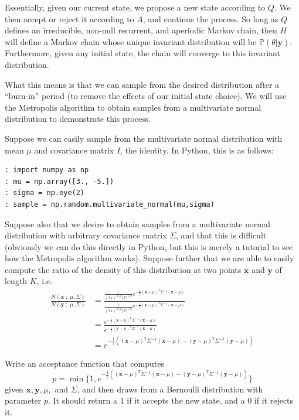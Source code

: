 Essentially, given our current state, we propose a new state according to $Q$. We then accept or reject it according to $A$, and continue the process. So long as $Q$ defines an irreducible, non-null recurrent, and aperiodic Markov chain, then $H$ will define a Markov chain whose unique invariant distribution will be $\mathbb{P}(\theta | \mathbf{y})$. Furthermore, given any initial state, the chain will converge to this invariant distribution.

What this means is that we can sample from the desired distribution after a ``burn-in'' period (to remove the effects of our initial state choice). We will use the Metropolis algorithm to obtain samples from a multivariate normal distribution to demonstrate this process.

Suppose we can easily sample from the multivariate normal distribution with mean $\mu$ and covariance matrix $I$, the identity. In Python, this is as follows:
\begin{lstlisting}
: import numpy as np
: mu = np.array([3., -5.])
: sigma = np.eye(2)
: sample = np.random.multivariate_normal(mu,sigma)
\end{lstlisting}

Suppose also that we desire to obtain samples from a multivariate normal distribution with arbitrary covariance matrix $\Sigma$, and that this is difficult (obviously we can do this directly in Python, but this is merely a tutorial to see how the Metropolis algorithm works). Suppose further that we are able to easily compute the ratio of the density of this distribution at two points $\mathbf{x}$ and $\mathbf{y}$ of length $K$, i.e.
\begin{align*}
\frac{N(\mathbf{x} \; ; \; \mu, \Sigma)}{N(\mathbf{y} \; ; \; \mu, \Sigma)} & = \frac{\frac{1}{(2\pi)^{K/2}|\Sigma|^{1/2}} e^{-\frac{1}{2}(\mathbf{x} - \mu)^{T} \Sigma^{-1} (\mathbf{x} - \mu)}}{\frac{1}{(2\pi)^{K/2}|\Sigma|^{1/2}} e^{-\frac{1}{2}(\mathbf{y} - \mu)^{T} \Sigma^{-1} (\mathbf{x} - \mu)}} \\
& = \frac{e^{-\frac{1}{2}(\mathbf{x} - \mu)^{T} \Sigma^{-1} (\mathbf{x} - \mu)}}{e^{-\frac{1}{2}(\mathbf{y} - \mu)^{T} \Sigma^{-1} (\mathbf{x} - \mu)}} \\
& = e^{-\frac{1}{2}\left((\mathbf{x} - \mu)^{T} \Sigma^{-1} (\mathbf{x} - \mu) - (\mathbf{y} - \mu)^{T} \Sigma^{-1} (\mathbf{y} - \mu)\right)}
\end{align*}

\begin{problem} \label{problem1}
Write an acceptance function that computes 
\begin{equation*}
p = \min \{1, e^{-\frac{1}{2}\left((\mathbf{x} - \mu)^{T} \Sigma^{-1} (\mathbf{x} - \mu) - (\mathbf{y} - \mu)^{T} \Sigma^{-1} (\mathbf{y} - \mu)\right)}\}
\end{equation*}
given $\mathbf{x}, \mathbf{y}, \mu,$ and $\Sigma$, and then draws from a Bernoulli distribution with parameter $p$. It should return a $1$ if it accepts the new state, and a $0$ if it rejects it.
\end{problem}

